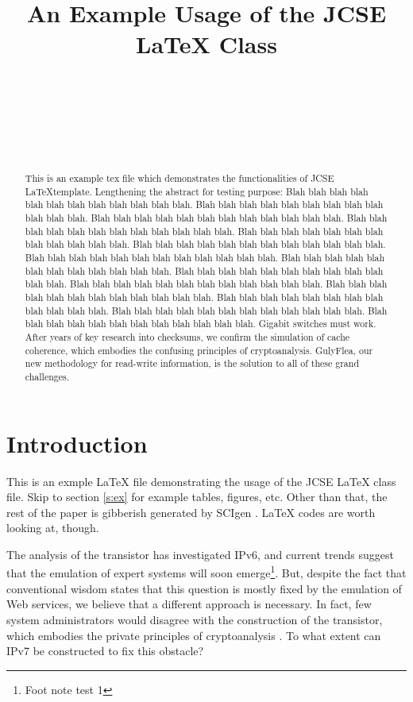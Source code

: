 \documentclass{jcse}
\title[JCSE Template Example]{An Example Usage of the JCSE \LaTeX\xspace Class}
\author{
	\authname{Debra Park} \\
	\affaddr{School of Electrical Engineering and Computer Science,
	  ABC National University, Seoul, Korea}
	\email{debbie@abc.ac.kr} \\
	\\
	\authname{Dezhen Zhu$^*$} \\
	\affaddr{School of Electrical Engineering and Computer Science,
	  ABC National University, Seoul, Korea}
	\email{jdj@abc.ac.kr} \\
}
\begin{document}
\begin{abstract}
This is an example tex file which demonstrates the functionalities of
JCSE \LaTeX template.
Lengthening the abstract for testing purpose:
Blah blah blah blah blah blah blah blah blah blah blah blah.
Blah blah blah blah blah blah blah blah blah blah blah blah.
Blah blah blah blah blah blah blah blah blah blah blah blah.
Blah blah blah blah blah blah blah blah blah blah blah blah.
Blah blah blah blah blah blah blah blah blah blah blah blah.
Blah blah blah blah blah blah blah blah blah blah blah blah.
Blah blah blah blah blah blah blah blah blah blah blah blah.
Blah blah blah blah blah blah blah blah blah blah blah blah.
Blah blah blah blah blah blah blah blah blah blah blah blah.
Blah blah blah blah blah blah blah blah blah blah blah blah.
Blah blah blah blah blah blah blah blah blah blah blah blah.
Blah blah blah blah blah blah blah blah blah blah blah blah.
Blah blah blah blah blah blah blah blah blah blah blah blah.
Blah blah blah blah blah blah blah blah blah blah blah blah.
Gigabit switches  must work. After years of key research into
checksums, we confirm the simulation of cache coherence, which embodies
the confusing principles of cryptoanalysis. GulyFlea, our new
methodology for read-write information, is the solution to all of these
grand challenges.
\end{abstract}

\maketitle



\section{Introduction} \label{s:intro}

This is an exmple \LaTeX\xspace file demonstrating the
usage of the JCSE \LaTeX\xspace class file.
Skip to section \ref{s:ex} for example tables, figures, etc.
Other than that, the rest of the paper is gibberish generated
by SCIgen \cite{scigen}.
\LaTeX\xspace codes are worth looking at, though.

The analysis of the transistor has investigated IPv6, and current
trends suggest that the emulation of expert systems will soon
emerge\footnote{Foot note test 1}.
But,  despite the fact that conventional wisdom states that this
question is mostly fixed by the emulation of Web services, we believe
that a different approach is necessary.
In fact, few system
administrators would disagree with the construction of the transistor,
which embodies the private principles of cryptoanalysis \cite{cite:0}.
To what extent can IPv7  be constructed to fix this obstacle?
\end{document}

